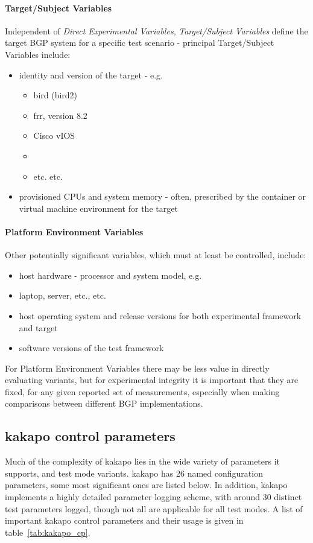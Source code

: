 \paragraph{Target/Subject Variables}
Independent of \textit{Direct Experimental Variables}, \textit{Target/Subject Variables} define the target BGP system for a specific test scenario - principal Target/Subject Variables include:
\begin{itemize}
    \item identity and version of the target - e.g.
        \begin{itemize}
            \item bird (bird2)
            \item frr, version 8.2
            \item Cisco vIOS
            \item \hbgp
            \item etc. etc.
        \end{itemize}
    \item provisioned CPUs and system memory - often, prescribed by the container or virtual machine environment for the target
\end{itemize}

\paragraph{Platform Environment Variables}
Other potentially significant variables, which must at least be controlled, include:
\begin{itemize}
    \item host hardware - processor and system model, e.g.
    \item laptop, server, etc., etc.
    \item host operating system and release versions for both experimental framework and target
    \item software versions of the test framework
\end{itemize}

For Platform Environment Variables there may be less value in directly evaluating variants, but for experimental integrity it is important that they are fixed, for any given reported set of measurements, especially when making comparisons between different BGP implementations.

\subsection{kakapo control parameters}
Much of the complexity of kakapo lies in the wide variety of parameters it supports, and test mode variants.
kakapo has 26 named configuration parameters, some most significant ones are listed below.
In addition, kakapo implements a highly detailed parameter logging scheme, with around 30 distinct test parameters logged, though not all are applicable for all test modes.
A list of important kakapo control parameters and their usage is given in table~\ref{tab:kakapo_cp}.

